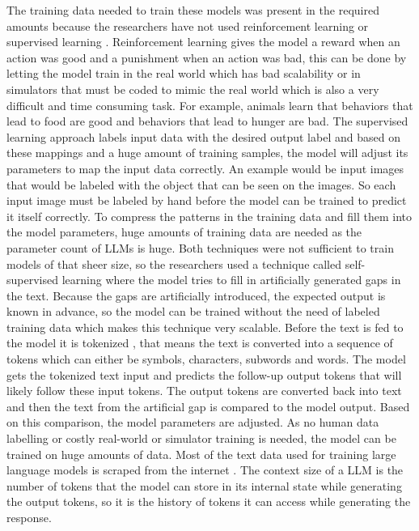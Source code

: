 \documentclass[draft,final]{thesisclass} %
\begin{document}
The training data needed to train these models was present in the required amounts because the researchers have not used reinforcement learning \cite{rl_bible} or supervised learning \cite[3]{sl_bible}.
Reinforcement learning gives the model a reward when an action was good and a punishment when an action was bad, this can be done by letting the model train in the real world which has bad scalability or in simulators that must be coded to mimic the real world which is also a very difficult and time consuming task.
For example, animals learn that behaviors that lead to food are good and behaviors that lead to hunger are bad.
The supervised learning approach labels input data with the desired output label and based on these mappings and a huge amount of training samples, the model will adjust its parameters to map the input data correctly.
An example would be input images that would be labeled with the object that can be seen on the images. So each input image must be labeled by hand before the model can be trained to predict it itself correctly.
To compress the patterns in the training data and fill them into the model parameters, huge amounts of training data are needed as the parameter count of \acs{LLM}s is huge.
Both techniques were not sufficient to train models of that sheer size, so the researchers used a technique called self-supervised learning \cite[7]{llm_literature_review} where the model tries to fill in artificially generated gaps in the text.
Because the gaps are artificially introduced, the expected output is known in advance, so the model can be trained without the need of labeled training data which makes this technique very scalable.
Before the text is fed to the model it is tokenized \cite[4]{llm_literature_review}, that means the text is converted into a sequence of tokens which can either be symbols, characters, subwords and words.
The model gets the tokenized text input and predicts the follow-up output tokens that will likely follow these input tokens. The output tokens are converted back into text and then the text from the artificial gap is compared to the model output.
Based on this comparison, the model parameters are adjusted. As no human data labelling or costly real-world or simulator training is needed, the model can be trained on huge amounts of data.
Most of the text data used for training large language models is scraped from the internet \cite[1]{llm_literature_review}.
The context size of a \acs{LLM} is the number of tokens that the model can store in its internal state while generating the output tokens, so it is the history of tokens it can access while generating the response.
\end{document}
